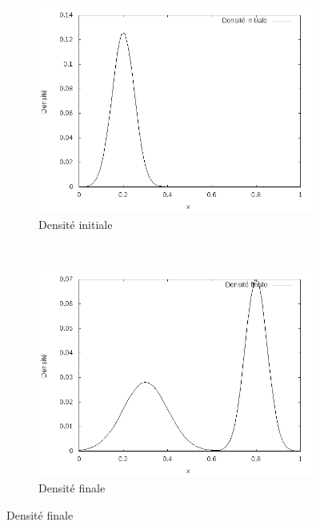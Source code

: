 \documentclass{beamer}
\begin{document}
\begin{frame}
\begin{figure}[!h]
\centering 
	\begin{subfigure}[b]{0.48\linewidth}
	\includegraphics[width=\textwidth]{img/1DMixture/f0.png}
	\caption{Densité initiale}
	\end{subfigure}
	~
	\begin{subfigure}[b]{0.48\linewidth}
	\includegraphics[width=\textwidth]{img/1DMixture/f1.png}
	\caption{Densité finale}
	\end{subfigure}
	

\end{figure}
\end{frame}
\end{document}
